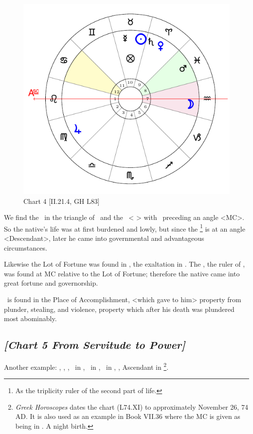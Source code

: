 \clearpage
\begin{figure}
\centering
\vspace{-20pt}
\includegraphics[width=.68\textwidth]{charts/2_21_4}
\caption{Chart 4 [II.21.4, GH L83]}
\label{fig:chart04}
\end{figure}

We find the \Sun\, in the triangle of \Venus\, and the \Moon\, <\Taurus\,\Virgo\,\Capricorn> with \Venus\, preceding an angle <MC>. So the native’s life was at first burdened and lowly, but since the \Moon\footnote{As the triplicity ruler of the second part of life.} is at an angle <Descendant>, later he came into governmental and advantageous circumstances. 

Likewise the Lot of Fortune was found in \Taurus, the exaltation in \Cancer. The \Moon, the ruler of \Cancer, was found at MC relative to the Lot of Fortune; therefore the native came into great fortune and governorship. 

\Mars\, is found in the Place of Accomplishment, <which gave to him> property from plunder, stealing, and violence, property which after his death was plundered most abominably.
\newpage
\subsection*{\textit{[Chart 5 From Servitude to Power]}}

Another example: \Sun, \Mercury, \Saturn, \Jupiter\, in \Sagittarius, \Moon\, in \Cancer, \Mars\, in \Virgo,
\Venus, Ascendant in \Libra
\footnote{\textit{Greek Horoscopes} dates the chart (L74.XI) to approximately November 26, 74 AD. It is also used as an example in Book VII.36 where the MC is given as being in \Cancer. A night birth.}.

